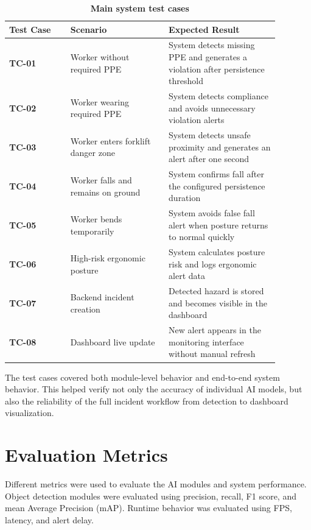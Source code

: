 \begin{table}[H]
\centering
\renewcommand{\arraystretch}{1.55}
\begin{tabular}{|>{\centering\arraybackslash}p{0.2\linewidth}|>{\centering\arraybackslash}p{0.32\linewidth}|>{\centering\arraybackslash}p{0.36\linewidth}|}
\hline
\textbf{Test Case} & \textbf{Scenario} & \textbf{Expected Result} \\
\hline
\textbf{TC-01} & Worker without required PPE & System detects missing PPE and generates a violation after persistence threshold \\
\hline
\textbf{TC-02} & Worker wearing required PPE & System detects compliance and avoids unnecessary violation alerts \\
\hline
\textbf{TC-03} & Worker enters forklift danger zone & System detects unsafe proximity and generates an alert after one second \\
\hline
\textbf{TC-04} & Worker falls and remains on ground & System confirms fall after the configured persistence duration \\
\hline
\textbf{TC-05} & Worker bends temporarily & System avoids false fall alert when posture returns to normal quickly \\
\hline
\textbf{TC-06} & High-risk ergonomic posture & System calculates posture risk and logs ergonomic alert data \\
\hline
\textbf{TC-07} & Backend incident creation & Detected hazard is stored and becomes visible in the dashboard \\
\hline
\textbf{TC-08} & Dashboard live update & New alert appears in the monitoring interface without manual refresh \\
\hline
\end{tabular}
\caption{\textbf{Main system test cases}}
\label{tab:chapter6-test-cases}
\end{table}

The test cases covered both module-level behavior and end-to-end system behavior. This helped verify not only the accuracy of individual AI models, but also the reliability of the full incident workflow from detection to dashboard visualization.

\section{Evaluation Metrics}

Different metrics were used to evaluate the AI modules and system performance. Object detection modules were evaluated using precision, recall, F1 score, and mean Average Precision (mAP). Runtime behavior was evaluated using FPS, latency, and alert delay.

